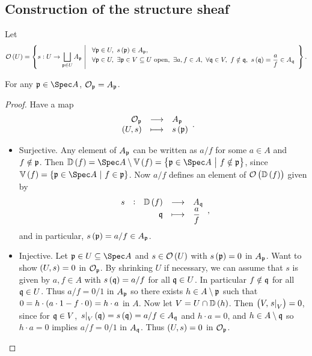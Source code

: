 \subsection{Construction of the structure sheaf}

Let
$$ \OOO\br{U} = \cbr{s : U \to \bigsqcup_{\ppp \in U} A_\ppp \st \begin{array}{l} \forall \ppp \in U, \ s\br{\ppp} \in A_\ppp, \\ \forall \ppp \in U, \ \exists \ppp \in V \subseteq U \ \text{open}, \ \exists a, f \in A, \ \forall \qqq \in V, \ f \notin \qqq, \ s\br{\qqq} = \dfrac{a}{f} \in A_\qqq \end{array}}. $$

\begin{proposition}
For any $ \ppp \in \Spec A $, $ \mathcal{O}_{\mathfrak{p}} = A_{\mathfrak{p}} $.
\end{proposition}

\begin{proof}
Have a map
$$ \function{\OOO_\ppp}{A_\ppp}{\br{U, s}}{s\br{\ppp}}. $$
\begin{itemize}
\item Surjective. Any element of $ A_{\mathfrak{p}} $ can be written as $ a / f $ for some $ a \in A $ and $ f \notin \mathfrak{p} $. Then $ \DD\br{f} = \Spec A \setminus \VV\br{f} = \cbr{\ppp \in \Spec A \st f \notin \ppp} $, since $ \VV\br{f} = \cbr{\ppp \in \Spec A \st f \in \ppp} $. Now $ a / f $ defines an element of $ \OOO\br{\DD\br{f}} $ given by
$$ \function[s]{\DD\br{f}}{A_\qqq}{\qqq}{\dfrac{a}{f}}, $$
and in particular, $ s\br{\ppp} = a / f \in A_\ppp $.
\item Injective. Let $ \ppp \in U \subseteq \Spec A $ and $ s \in \OOO\br{U} $ with $ s\br{\ppp} = 0 $ in $ A_{\mathfrak{p}} $. Want to show $ \br{U, s} = 0 $ in $ \mathcal{O}_{\mathfrak{p}} $. By shrinking $ U $ if necessary, we can assume that $ s $ is given by $ a, f \in A $ with $ s\br{\qqq} = a / f $ for all $ \mathfrak{q} \in U $. In particular $ f \notin \mathfrak{q} $ for all $ \mathfrak{q} \in U $. Thus $ a / f = 0 / 1 $ in $ A_{\mathfrak{p}} $ so there exists $ h \in A \setminus \mathfrak{p} $ such that $ 0 = h \cdot \br{a \cdot 1 - f \cdot 0} = h \cdot a $ in $ A $. Now let $ V = U \cap \DD\br{h} $. Then $ \br{V, \eval{s}_V} = 0 $, since for $ \mathfrak{q} \in V $, $ \eval{s}_V\br{\qqq} = s\br{\qqq} = a / f \in A_\qqq $ and $ h \cdot a = 0 $, and $ h \in A \setminus \mathfrak{q} $ so $ h \cdot a = 0 $ implies $ a / f = 0 / 1 $ in $ A_{\mathfrak{q}} $. Thus $ \br{U, s} = 0 $ in $ \mathcal{O}_{\mathfrak{p}} $.
\end{itemize}
\end{proof}

